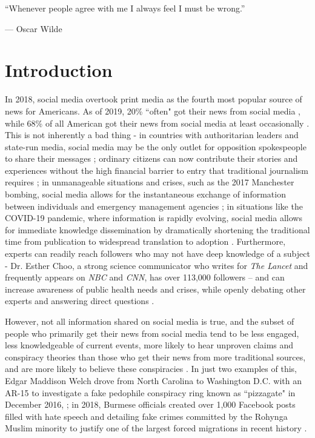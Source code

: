\documentclass[preprint,review,12pt]{elsarticle}
\begin{document}
\epigraph{“Whenever people agree with me I always feel I must be wrong.”}{--- \textup{Oscar Wilde}}

\section{Introduction}

\label{introduction}
 In 2018, social media overtook print media as the fourth most popular source of news for Americans. As of 2019, 20\% ``often" got their news from social media \cite{shearer2018social}, while 68\% of all American got their news from social media at least occasionally \cite{matsa2018news}. This is not inherently a bad thing - in countries with authoritarian leaders and state-run media, social media may be the only outlet for opposition spokespeople to share their messages \cite{walker2014breaking}; ordinary citizens can now contribute their stories and experiences without the high financial barrier to entry that traditional journalism requires \cite{qualman2012socialnomics, tapscott2008wikinomics}; in unmanageable situations and crises, such as the 2017 Manchester bombing, social media allows for the instantaneous exchange of information between individuals and emergency management agencies \cite{mirbabaie2020breaking, eriksson2016facebook}; in situations like the COVID-19 pandemic, where information is rapidly evolving, social media allows for immediate knowledge dissemination by dramatically shortening the traditional time from publication to widespread translation to adoption \cite{chan2020social}. Furthermore, experts can readily reach followers who may not have deep knowledge of a subject - Dr. Esther Choo, a strong science communicator who writes for \textit{The Lancet} and frequently appears on \textit{NBC} and \textit{CNN}, has over 113,000 followers – and can increase awareness of public health needs and crises, while openly debating other experts and answering direct questions \cite{gottlieb2020information}.

However, not all information shared on social media is true, and the subset of people who primarily get their news from social media tend to be less engaged, less knowledgeable of current events, more likely to hear unproven claims and conspiracy theories than those who get their news from more traditional sources, and are more likely to believe these conspiracies \cite{mitchell2020americans}. In just two examples of this, Edgar Maddison Welch drove from North Carolina to Washington D.C. with an AR-15 to investigate a fake pedophile conspiracy ring known as ``pizzagate" in December 2016, \cite{goldman2016comet}; in 2018, Burmese officials created over 1,000 Facebook posts filled with hate speech and detailing fake crimes committed by the Rohynga Muslim minority to justify one of the largest forced migrations in recent history \cite{subedar2018country}.
\end{document}
